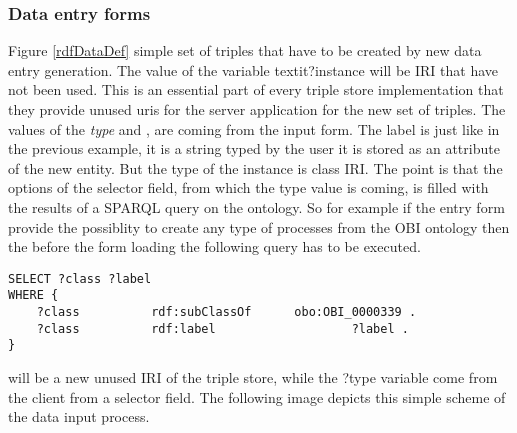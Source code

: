 \subsubsection{Data entry forms} \label{233}


Figure \ref{rdfDataDef} simple set of triples that have to be created by new data entry generation. The value of the variable textit{?instance} will be IRI that have not been used. This is an essential part of every triple store implementation that they provide unused uris for the server application for the new set of triples. The values of the \textit{type} and , 
are coming from the input form. The label is just like in the previous example, it is a string typed by the user it is stored as an attribute of the new entity. But the type of the instance is class IRI. The point is that the options of the selector field, from which the type value is coming, is filled with the results of a SPARQL query on the ontology. So for example if the entry form provide the possiblity to create any type of processes from the OBI ontology then the before the form loading the following query has to be executed.

\begin{lstlisting}[captionpos=b, caption= SPARQL query for the input form, label=skullJSON, belowskip=1em, aboveskip=2em,
basicstyle=\footnotesize,frame=single]
SELECT ?class ?label
WHERE {
	?class 			rdf:subClassOf	 	obo:OBI_0000339 .  
	?class			rdf:label					?label . 
}
\end{lstlisting}

will be a new unused IRI of the triple store, while the ?type variable come from the client from a selector field. The following image depicts this simple scheme of the data input process. 


